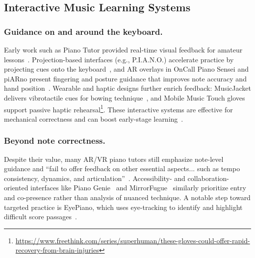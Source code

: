 \documentclass[sigconf,review,anonymous]{acmart}
\begin{document}
\subsection{Interactive Music Learning Systems}
\label{sec:rw-interactive}

\subsubsection{Guidance on and around the keyboard.}
Early work such as Piano Tutor provided real-time visual feedback for amateur lessons~\cite{Dannenberg1992}. Projection-based interfaces (e.g., P.I.A.N.O.) accelerate practice by projecting cues onto the keyboard~\cite{Rogers2014}, and AR overlays in OnCall Piano Sensei and piARno present fingering and posture guidance that improves note accuracy and hand position~\cite{Chiang2015,Rigby2020}. Wearable and haptic designs further enrich feedback: MusicJacket delivers vibrotactile cues for bowing technique~\cite{Johnson2010}, and Mobile Music Touch gloves support passive haptic rehearsal\footnote{\url{https://www.freethink.com/series/superhuman/these-gloves-could-offer-rapid-recovery-from-brain-injuries}}. These interactive systems are effective for mechanical correctness and can boost early-stage learning~\cite{Yuksel2016}.

\subsubsection{Beyond note correctness.}
Despite their value, many AR/VR piano tutors still emphasize note-level guidance and ``fail to offer feedback on other essential aspects... such as tempo consistency, dynamics, and articulation''~\cite{Wilson2023VRPianoReview}. Accessibility- and collaboration-oriented interfaces like Piano Genie~\cite{Donahue2019} and MirrorFugue~\cite{xiao2011} similarly prioritize entry and co-presence rather than analysis of nuanced technique. A notable step toward targeted practice is EyePiano, which uses eye-tracking to identify and highlight difficult score passages~\cite{Karolus2023}.
\end{document}

